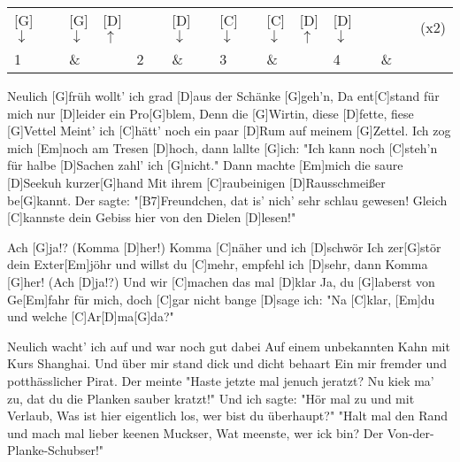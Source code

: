 

\begin{guitar}
	\newcommand{\up}{$\uparrow$}%
	\newcommand{\down}{$\downarrow$}%
	{\footnotesize \setlength{\tabcolsep}{3pt} \begin{tabular}{*{4}{*{4}{p{1.5mm}}|}c}
		[G]\down	& ~	& [G]\down	& [D]\up	&
					&	& [D]\down 	&			&
		[C]\down 	&	& [C]\down	& [D]\up	& 
		[D]\down	&	&			&			& (x2) \\
		1			&	& \&		&			& 
		2			&	& \&		&			& 
		3			&	& \&		&			& 
		4			&	& \&		&			&
	\end{tabular}%
	}%
	
	Neulich [G]früh wollt' ich grad [D]aus der Schänke [G]geh'n,
	Da ent[C]stand für mich nur [D]leider ein Pro[G]blem,
	Denn die [G]Wirtin, diese [D]fette, fiese [G]Vettel
	Meint' ich [C]hätt' noch ein paar [D]Rum auf meinem [G]Zettel.
	Ich zog mich [Em]noch am Tresen [D]hoch, dann lallte [G]ich:
	"Ich kann noch [C]steh'n für halbe [D]Sachen zahl' ich [G]nicht."
	Dann machte [Em]mich die saure [D]Seekuh kurzer[G]hand
	Mit ihrem [C]raubeinigen [D]Rausschmeißer be[G]kannt.
	Der sagte: "[B7]Freundchen, dat is' nich' sehr schlau gewesen!
	Gleich [C]kannste dein Gebiss hier von den Dielen [D]lesen!"
	
	Ach [G]ja!? (Komma [D]her!) Komma [C]näher und ich [D]schwör
	Ich zer[G]stör dein Exter[Em]jöhr und willst du [C]mehr, empfehl ich [D]sehr, dann
	Komma [G]her! (Ach [D]ja!?) Und wir [C]machen das mal [D]klar
	Ja, du [G]laberst von Ge[Em]fahr für mich, doch [C]gar nicht bange [D]sage ich:
	"Na [C]klar, [Em]du und welche [C]Ar[D]ma[G]da?"
	
	\pagebreak
	
	Neulich wacht' ich auf und war noch gut dabei
	Auf einem unbekannten Kahn mit Kurs Shanghai.
	Und über mir stand dick und dicht behaart
	Ein mir fremder und potthässlicher Pirat.
	Der meinte "Haste jetzte mal jenuch jeratzt?
	Nu kiek ma' zu, dat du die Planken sauber kratzt!"
	Und ich sagte: "Hör mal zu und mit Verlaub,
	Was ist hier eigentlich los, wer bist du überhaupt?"
	"Halt mal den Rand und mach mal lieber keenen Muckser,
	Wat meenste, wer ick bin? Der Von-der-Planke-Schubser!"
	
	 
		

\end{guitar}
